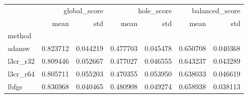 \begin{tabular}{lrrrrrr}
\toprule
 & \multicolumn{2}{r}{global_score} & \multicolumn{2}{r}{hole_score} & \multicolumn{2}{r}{balanced_score} \\
 & mean & std & mean & std & mean & std \\
method &  &  &  &  &  &  \\
\midrule
adamw & 0.823712 & 0.044219 & 0.477703 & 0.045478 & 0.650708 & 0.040368 \\
l3cr_r32 & 0.809446 & 0.052667 & 0.477027 & 0.046555 & 0.643237 & 0.043289 \\
l3cr_r64 & 0.805711 & 0.055203 & 0.470355 & 0.053950 & 0.638033 & 0.046619 \\
lbfgs & 0.836968 & 0.040465 & 0.480908 & 0.049274 & 0.658938 & 0.038113 \\
\bottomrule
\end{tabular}
